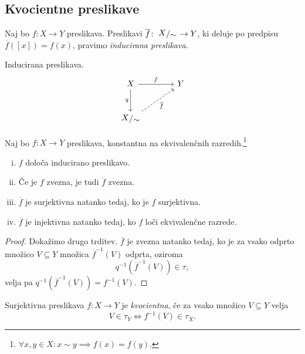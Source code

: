 \obvs

\newpage

\subsection{Kvocientne preslikave}


\begin{definicija}
Naj bo $f \colon X \to Y$ preslikava. Preslikavi
$\overline{f} \colon \kvoc{X}{\sim} \to Y$, ki deluje po predpisu
$\overline{f}([x]) = f(x)$, pravimo
\emph{inducirana preslikava}.
\end{definicija}

\begin{skica}{Inducirana preslikava.}
\[
\begin{tikzcd}[column sep=large, row sep=large]
X \arrow[r, "f"] \arrow[d, "q"']                      & Y \\
\kvoc{X}{\sim} \arrow[ur, dashrightarrow, "\overline{f}"'] &
\end{tikzcd}
\]
\end{skica}

\begin{trditev}
Naj bo $f \colon X \to Y$ preslikava, konstantna na ekvivalenčnih
razredih.\footnote{
$\forall x, y \in X \colon x \sim y \implies f(x) = f(y)$.}

\begin{enumerate}[i)]
\item $f$ določa inducirano preslikavo.
\item Če je $f$ zvezna, je tudi $\overline{f}$ zvezna.
\item $\overline{f}$ je surjektivna natanko tedaj, ko je $f$
surjektivna.
\item $\overline{f}$ je injektivna natanko tedaj, ko $f$ loči
ekvivalenčne razrede.
\end{enumerate}
\end{trditev}

\begin{proof}
Dokažimo drugo trditev. $\overline{f}$ je zvezna natanko tedaj, ko
je za vsako odprto množico $V \subseteq Y$ množica
$\overline{f}^{-1}(V)$ odprta, oziroma
\[
q^{-1}\left(\overline{f}^{-1}(V)\right) \in \tau,
\]
velja pa $q^{-1}\left(\overline{f}^{-1}(V)\right) = f^{-1}(V)$.
\end{proof}

\begin{definicija}
Surjektivna preslikava $f \colon X \to Y$ je
\emph{kvocientna}, če za vsako
množico $V \subseteq Y$ velja
\[
V \in \tau_Y \iff f^{-1}(V) \in \tau_X.
\]
\end{definicija}


